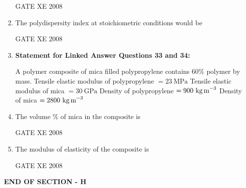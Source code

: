 \documentclass[12pt]{article}
\begin{document}
\begin{enumerate}
GATE XE 2008

\item The polydispersity index at stoichiometric conditions would be  

\begin{enumerate}
\end{enumerate}

GATE XE 2008


\item[]

\textbf{Statement for Linked Answer Questions 33 and 34:}  

A polymer composite of mica filled polypropylene contains $60\%$ polymer by mass.  
Tensile elastic modulus of polypropylene $= 23\ \text{MPa}$  
Tensile elastic modulus of mica $= 30\ \text{GPa}$  
Density of polypropylene $= 900\ \text{kg\,m}^{-3}$  
Density of mica $= 2800\ \text{kg\,m}^{-3}$

\item The volume \% of mica in the composite is  

\begin{enumerate}
\end{enumerate}

GATE XE 2008

\item  The modulus of elasticity of the composite is  

\begin{enumerate}
\end{enumerate}

GATE XE 2008

\end{enumerate}
\begin{center}
    \textbf{END OF SECTION - H}
\end{center}
\end{document}
